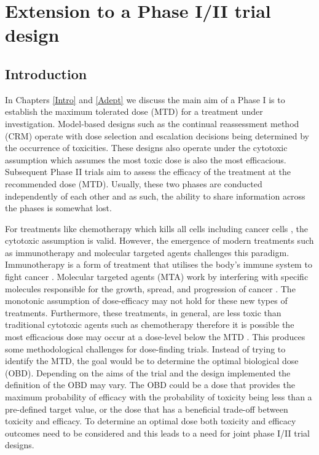 
\chapter{Extension to a Phase I/II trial design} %

\label{WT} %


\section{Introduction}
\label{WT:Introduction}

In Chapters \ref{Intro} and \ref{Adept} we discuss the main aim of a Phase \RN{1} is to establish the maximum tolerated dose (MTD) for a treatment under investigation. Model-based designs such as the continual reassessment method (CRM) \cite{oquigleyContinualReassessmentMethod1990} operate with dose selection and escalation decisions being determined by the occurrence of toxicities. These designs also operate under the cytotoxic assumption which assumes the most toxic dose is also the most efficacious. Subsequent Phase \RN{2} trials aim to assess the efficacy of the treatment at the recommended dose (MTD). Usually, these two phases are conducted independently of each other and as such, the ability to share information across the phases is somewhat lost. 

For treatments like chemotherapy which kills all cells including cancer cells \cite{corrieCytotoxicChemotherapyClinical2008}, the cytotoxic assumption is valid. However, the emergence of modern treatments such as immunotherapy and molecular targeted agents challenges this paradigm. Immunotherapy is a form of treatment that utilises the body's immune system to fight cancer \cite{mellmanCancerImmunotherapyComes2011}. Molecular targeted agents (MTA) work by interfering with specific molecules responsible for the growth, spread, and progression of cancer \cite{soriaAddedValueMolecular2011}. The monotonic assumption of dose-efficacy may not hold for these new types of treatments. Furthermore, these treatments, in general, are less toxic than traditional cytotoxic agents such as chemotherapy therefore it is possible the most efficacious dose may occur at a dose-level below the MTD \cite{ahnOptimalBiologicalDose2016}. This produces some methodological challenges for dose-finding trials. Instead of trying to identify the MTD, the goal would be to determine the optimal biological dose (OBD). Depending on the aims of the trial and the design implemented the definition of the OBD may vary. The OBD could be a dose that provides the maximum probability of efficacy with the probability of toxicity being less than a pre-defined target value, or the dose that has a beneficial trade-off between toxicity and efficacy. To determine an optimal dose both toxicity and efficacy outcomes need to be considered and this leads to a need for joint phase \RN{1}/\RN{2} trial designs. 

